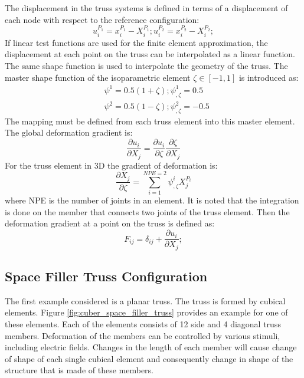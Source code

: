 The displacement in the truss systems is defined in terms of a displacement of each node with respect to the reference configuration: 
\begin{equation}
u^{P_1}_i=x^{P_1}_i-X^{P_1}_i ; u^{P_2}_i=x^{P_2}_i-X^{P_2}_i ;  
\end{equation}
If linear test functions are used for the finite element approximation, the displacement at each point on the truss can be interpolated as a linear function. The same shape function is used to interpolate the geometry of the truss. The master shape function of the isoparametric element $\zeta \in [-1,1]$ is introduced as:
\begin{equation}
\begin{aligned}
& \psi^1=0.5(1+\zeta); \psi^1_{,\zeta}= 0.5 \\
& \psi^2=0.5(1-\zeta); \psi^2_{,\zeta}=-0.5
\end{aligned}
\label{shape_function_truss} 
\end{equation}
The mapping must be defined from each truss element into this master element.
The global deformation gradient is:
\begin{equation}
\frac{\partial u_i}{\partial X_j}=\frac{\partial u_i}{\partial \zeta}
\frac{\partial \zeta}{\partial X_j}
\label{eqn:global_derivitave} 
\end{equation}
For the truss element in 3D the gradient of deformation is:
\begin{equation}
\frac{\partial X_j }{\partial \zeta}= 
  \sum_{i=1}^{NPE=2} \psi^i_{,\zeta} X^{P_i}_j 
\label{eqn:delXi_delzeta} 
\end{equation}
where NPE is the number of joints in an element.
It is noted that the integration is done on the member that connects two joints of the truss element.
Then the deformation gradient at a point on the truss is defined as:
\begin{equation}
F_{ij}=\delta_{ij}+ \frac{\partial u_i}{\partial X_j};  
\end{equation}

\subsection{Space Filler Truss Configuration}
The first example considered is a planar truss. 
The truss is formed by cubical elements. Figure \ref{fig:cuber_space_filler_truss} provides an example for one of these elements. 
Each of the elements consists of 12 side and 4 diagonal truss members. Deformation of the members can be controlled by various stimuli, including electric fields. 
Changes in the length of each member will cause change of shape of each single cubical element and consequently change in shape of the structure that is made of these members.

